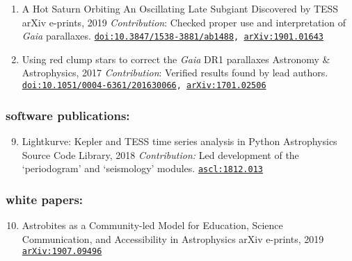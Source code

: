 \documentclass[letterpaper]{k-cv} %
\begin{document}
\begin{enumerate}
	\item {}
	{{A Hot Saturn Orbiting An Oscillating Late Subgiant Discovered by TESS}}
	{arXiv e-prints, 2019}
	{\textit{Contribution}: Checked proper use and interpretation of \textit{Gaia} parallaxes.}	
	{\texttt{\href{https://iopscience.iop.org/article/10.3847/1538-3881/ab1488}{doi:10.3847/1538-3881/ab1488}, \href{https://arxiv.org/abs/1901.01643}{arXiv:1901.01643}}}
	
	\item {}
	{Using red clump stars to correct the \emph{Gaia} DR1 parallaxes}
	{Astronomy \& Astrophysics, 2017}
	{\textit{Contribution}: Verified results found by lead authors.}	
	{\texttt{\href{https://www.aanda.org/articles/aa/abs/2017/02/aa30066-16/aa30066-16.html}{doi:10.1051/0004-6361/201630066}, \href{https://arxiv.org/abs/1701.02506}{arXiv:1701.02506}}}
\end{enumerate}
%
\clearpage
\vspace{-0.2cm}
\subsubsection*{\color{c2}software publications:}
\vspace{-0.2cm}
\begin{enumerate}
	\setcounter{enumi}{8}
	\item {}
	{Lightkurve: Kepler and TESS time series analysis in Python}
	{Astrophysics Source Code Library, 2018}
	{\textit{Contribution:} Led development of the `periodogram' and `seismology' modules.}
	{\texttt{\href{http://ascl.net/1812.013}{ascl:1812.013}}}
\end{enumerate}

\vspace{-0.2cm}
\subsubsection*{\color{c2}white papers:}
\vspace{-0.2cm}
\begin{enumerate}
		\setcounter{enumi}{9}
	\item {}
	{Astrobites as a Community-led Model for Education, Science Communication, and Accessibility in Astrophysics}
	{arXiv e-prints, 2019}
	{\texttt{\href{https://arxiv.org/abs/1907.09496}{arXiv:1907.09496}}}
\end{enumerate}
\end{document}
